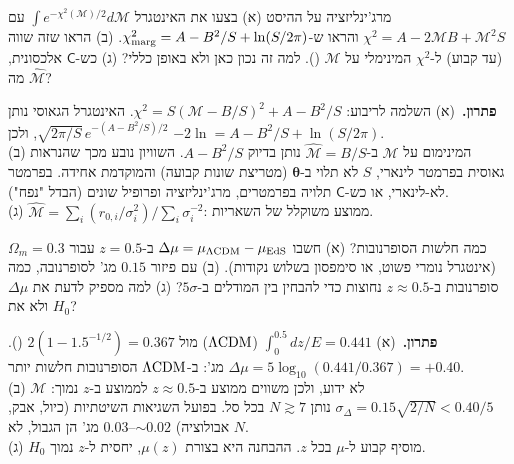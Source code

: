 \begin{exercise}{מרג'ינליזציה על ההיסט}
(א) בצעו את האינטגרל $\int e^{-\chi^2(\mathcal M)/2}d\mathcal M$ עם $\chi^2=A-2\mathcal MB+\mathcal M^2S$ והראו ש-$\chi^2_{\rm marg}=A-B^2/S+\ln(S/2\pi)$. (ב) הראו שזה שווה (עד קבוע) ל-$\chi^2$ המינימלי על $\mathcal M$ (). למה זה נכון כאן ולא באופן כללי? (ג) כש-$\mathsf C$ אלכסונית, מה $\hat{\mathcal M}$?
\end{exercise}
\begin{solbox}
\textbf{פתרון.}\ (א) השלמה לריבוע: $\chi^2=S(\mathcal M-B/S)^2+A-B^2/S$. האינטגרל הגאוסי נותן $\sqrt{2\pi/S}\,e^{-(A-B^2/S)/2}$, ולכן $-2\ln=A-B^2/S+\ln(S/2\pi)$.\\
(ב) המינימום על $\mathcal M$ ב-$\hat{\mathcal M}=B/S$ נותן בדיוק $A-B^2/S$. השוויון נובע מכך שהנראות גאוסית בפרמטר לינארי, $S$ לא תלוי ב-$\boldsymbol\theta$ (מטריצת שונות קבועה) והמוקדמת אחידה. בפרמטר לא-לינארי, או כש-$\mathsf C$ תלויה בפרמטרים, מרג'ינליזציה ופרופיל שונים (הבדל "נפח").\\
(ג) $\hat{\mathcal M}=\sum_i(r_{0,i}/\sigma_i^2)\big/\sum_i\sigma_i^{-2}$: ממוצע משוקלל של השאריות.
\end{solbox}

\begin{exercise}{כמה חלשות הסופרנובות?}
(א) חשבו $\Delta\mu=\mu_{\Lambda\mathrm{CDM}}-\mu_{\rm EdS}$ ב-$z=0.5$ עבור $\Omega_m=0.3$ (אינטגרל נומרי פשוט, או סימפסון בשלוש נקודות). (ב) עם פיזור $0.15$ מג' לסופרנובה, כמה סופרנובות ב-$z\approx0.5$ נחוצות כדי להבחין בין המודלים ב-$5\sigma$? (ג) למה מספיק לדעת את $\Delta\mu$ ולא את $H_0$?
\end{exercise}
\begin{solbox}
\textbf{פתרון.}\ (א) $\int_0^{0.5}dz/E=0.441$ ($\Lambda\mathrm{CDM}$) מול $2(1-1.5^{-1/2})=0.367$ (). $\Delta\mu=5\log_{10}(0.441/0.367)=+0.40$ מג': ב-$\Lambda\mathrm{CDM}$ הסופרנובות חלשות יותר.\\
(ב) $\mathcal M$ לא ידוע, ולכן משווים ממוצע ב-$z\approx0.5$ לממוצע ב-$z$ נמוך: $\sigma_{\Delta}=0.15\sqrt{2/N}<0.40/5$ נותן $N\gtrsim7$ בכל סל. בפועל השגיאות השיטתיות (כיול, אבק, אבולוציה) $\sim0.02$--$0.03$ מג' הן הגבול, לא $N$.\\
(ג) $H_0$ מוסיף קבוע ל-$\mu$ בכל $z$. ההבחנה היא בצורת $\mu(z)$, יחסית ל-$z$ נמוך.
\end{solbox}
